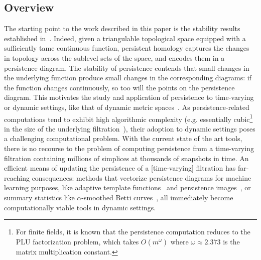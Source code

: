 \documentclass{siamart190516}
\begin{document}
\subsection{Overview}\label{sec:overview} 
The starting point to the work described in this paper is the stability results established in~\cite{cohen2007stability, cohen2006vines}. 
Indeed, given a triangulable topological space equipped with a sufficiently tame continuous function, persistent homology captures the changes in topology across the sublevel sets of the space, and encodes them in a persistence diagram. The stability of persistence contends that small changes in the underlying function produce small changes in the corresponding diagrams:  if the function changes continuously, so too will the points on the persistence diagram. 
This motivates the study and application of persistence to time-varying or dynamic settings, like that of dynamic metric spaces~\cite{kim2020spatiotemporal}. 
As persistence-related computations tend to exhibit high algorithmic complexity (e.g. essentially cubic\footnote{For finite fields, it is known that the persistence computation reduces to the PLU factorization problem, which takes $O(m^\omega)$ where $\omega \approx 2.373$ is the matrix multiplication constant.} in the size of the underlying filtration~\cite{morozov2005persistence}), their adoption to dynamic settings poses a challenging computational problem.
With the current state of the art tools, there is no recourse to the problem of computing persistence from a time-varying filtration containing millions of simplices at thousands of snapshots in time.
An efficient means of updating the persistence of a [time-varying] filtration has far-reaching consequences: methods that vectorize persistence diagrams for machine learning purposes, like adaptive template functions~\cite{polanco2019adaptive} and persistence images~\cite{adams2017persistence}, or summary statistics like $\alpha$-smoothed Betti curves~\cite{ulmer2019topological}, all immediately become computationally viable tools in dynamic  settings. 
  
\end{document}
